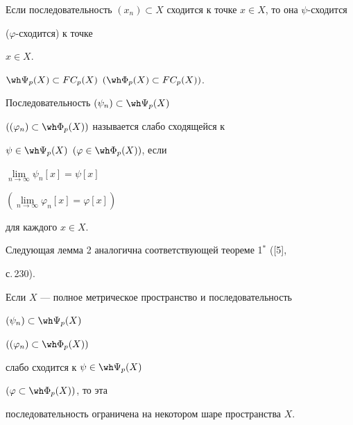 \begin{cor}


Если последовательность $(x_{n}) \subset


X$ сходится к точке $x \in X$, то она $\psi$-сходится


($\varphi$-сходится) к точке


$x \in X$.


\end{cor}





\begin{cor}


$\wh \Psi_{p}(X) \subset FC_{p}(X)$ $(\wh \Phi_{p}(X) \subset FC_{p}(X))$.


\end{cor}





\begin{defn}


Последовательность $(\psi_{n}) \subset \wh \Psi_{p}(X)$


$((\varphi_{n}) \subset \wh \Phi_{p}(X))$ называется  слабо сходящейся к


$\psi \in \wh \Psi_{p}(X)$ $(\varphi \in \wh \Phi_{p}(X))$, если


$\lim \limits_{n\rightarrow \infty}{\psi_{n}[x]} = \psi[x]$


$(\lim \limits_{n\rightarrow \infty}{\varphi_{n}[x]} =  \varphi[x])$


для каждого $x \in X$.


\end{defn}





Следующая лемма 2 аналогична соответствующей теореме 1$^*$ ([5],


с.\,230).





\begin{lem}


Если $X$ --- полное метрическое пространство и последовательность 


$(\psi_{n}) \subset \wh \Psi_{p}(X)$


$((\varphi_{n}) \subset \wh \Phi_{p}(X))$


слабо сходится к $\psi \in \wh \Psi_{p}(X)$


$(\varphi \subset \wh \Phi_{p}(X))$, то эта


последовательность ограничена на некотором шаре пространства $X$.


\end{lem}





